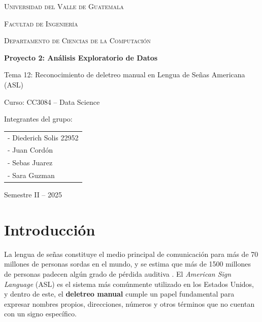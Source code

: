 \documentclass[12pt]{article}
\begin{document}
\begin{titlepage}
    \centering

    {\scshape\LARGE Universidad del Valle de Guatemala \par}
    \vspace{1cm}
    {\scshape\Large Facultad de Ingeniería \par}
    {\scshape\Large Departamento de Ciencias de la Computación \par}
    \vspace{1.5cm}
    {\huge\bfseries Proyecto 2: Análisis Exploratorio de Datos \par}
    \vspace{0.5cm}
    {\Large Tema 12: Reconocimiento de deletreo manual en Lengua de Señas Americana (ASL) \par}
    \vspace{2cm}
    {\Large Curso: CC3084 – Data Science \par}
    \vfill
    {\Large Integrantes del grupo: \par}
    \begin{tabular}{l}
        - Diederich Solis 22952 \\
        - Juan Cordón \\
        - Sebas Juarez \\
        - Sara Guzman \\
    \end{tabular}
    \vfill
    {\Large Semestre II – 2025 \par}
\end{titlepage}

\tableofcontents
\newpage

\section{Introducción}
La lengua de señas constituye el medio principal de comunicación para más de 70 millones de personas sordas en el mundo, y se estima que más de 1500 millones de personas padecen algún grado de pérdida auditiva \cite{who_hearing}.  
El \textit{American Sign Language} (ASL) es el sistema más comúnmente utilizado en los Estados Unidos, y dentro de este, el \textbf{deletreo manual} cumple un papel fundamental para expresar nombres propios, direcciones, números y otros términos que no cuentan con un signo específico.
\end{document}
